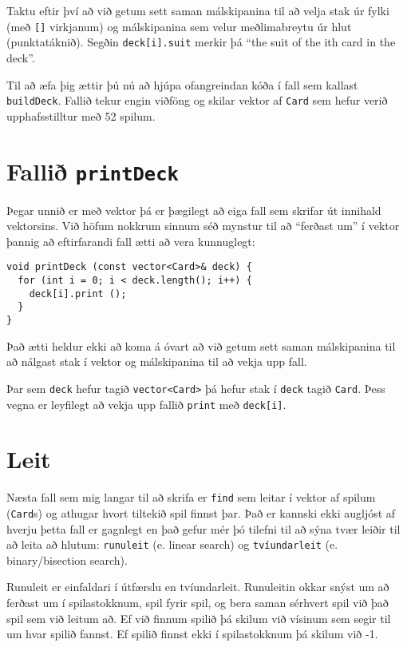 
Taktu eftir því að við getum sett saman málskipanina til að velja stak úr fylki (með {\tt []} virkjanum)
og málskipanina sem velur meðlimabreytu úr hlut (punktatáknið).
Segðin {\tt deck[i].suit} merkir þá ``the suit of the ith card in the deck''.


Til að æfa þig ættir þú nú að hjúpa ofangreindan kóða í fall sem kallast {\tt buildDeck}.
Fallið tekur engin viðföng og skilar vektor af {\tt Card} sem hefur verið upphafsstilltur með 52 spilum.

\section{Fallið {\tt printDeck}}
\label{printdeck}

Þegar unnið er með vektor þá er þægilegt að eiga fall sem skrifar út innihald vektorsins.
Við höfum nokkrum sinnum séð mynstur til að ``ferðast um'' í vektor þannig að eftirfarandi fall ætti að vera kunnuglegt:

\begin{verbatim}
void printDeck (const vector<Card>& deck) {
  for (int i = 0; i < deck.length(); i++) {
    deck[i].print ();
  }
}
\end{verbatim}
%
Það ætti heldur ekki að koma á óvart að við getum sett saman málskipanina til að nálgast stak í vektor og málskipanina til að vekja upp fall.

Þar sem {\tt deck} hefur tagið {\tt vector<Card>} þá hefur stak í {\tt deck} tagið {\tt Card}.
Þess vegna er leyfilegt að vekja upp fallið {\tt print} með {\tt deck[i]}.

\section{Leit}
\label{find}

Næsta fall sem mig langar til að skrifa er {\tt find} sem leitar í vektor af spilum ({\tt Card}s)
og athugar hvort tiltekið spil finnst þar.
Það er kannski ekki augljóst af hverju þetta fall er gagnlegt en það gefur mér þó tilefni til að sýna
tvær leiðir til að leita að hlutum: {\tt runuleit} (e. linear search) og {\tt tvíundarleit} (e. binary/bisection search).


Runuleit er einfaldari í útfærslu en tvíundarleit.
Runuleitin okkar snýst um að ferðast um í spilastokknum, spil fyrir spil, og bera saman sérhvert spil við það spil sem við leitum að.
Ef við finnum spilið þá skilum við vísinum sem segir til um hvar spilið fannst.
Ef spilið finnst ekki í spilastokknum þá skilum við -1.

